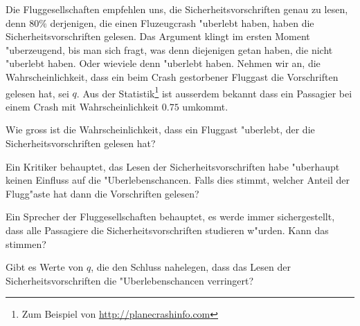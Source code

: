 Die Fluggesellschaften empfehlen uns, die Sicherheitsvorschriften
genau zu lesen, denn $80\%$ derjenigen, die einen Fluzeugcrash
"uberlebt haben, haben die Sicherheitsvorschriften gelesen.
Das Argument klingt im ersten Moment "uberzeugend, bis man
sich fragt, was denn diejenigen getan haben, die nicht
"uberlebt haben. Oder wieviele denn "uberlebt haben.
Nehmen wir an, die Wahrscheinlichkeit, dass ein
beim Crash gestorbener Fluggast die Vorschriften gelesen hat, sei
$q$.
Aus der Statistik\footnote{Zum Beispiel von \url{http://planecrashinfo.com}}
ist ausserdem bekannt dass ein Passagier bei einem Crash
mit Wahrscheinlichkeit $0.75$ umkommt.
\begin{teilaufgaben}
\item
Wie gross ist die Wahrscheinlichkeit, dass ein Fluggast "uberlebt, der die
Sicherheitsvorschriften gelesen hat?
\item
Ein Kritiker behauptet, das Lesen der Sicherheitsvorschriften
habe "uberhaupt keinen Einfluss auf die "Uberlebenschancen.
Falls dies stimmt, welcher Anteil der Flugg"aste hat dann die
Vorschriften gelesen?
\item
Ein Sprecher der Fluggesellschaften behauptet, es werde immer sichergestellt,
dass alle Passagiere die Sicherheitsvorschriften studieren w"urden.
Kann das stimmen?
\item
Gibt es Werte von $q$, die den Schluss nahelegen,
dass das Lesen der Sicherheitsvorschriften
die "Uberlebenschancen verringert?
\end{teilaufgaben}

